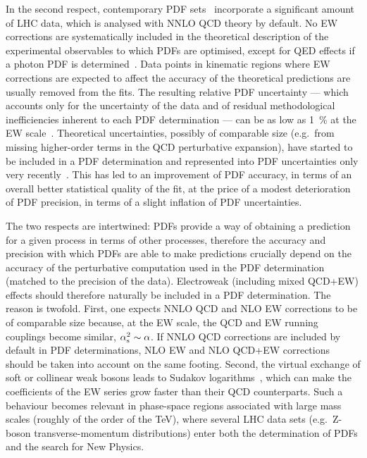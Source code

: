 In the second respect, contemporary PDF
sets~\cite{Harland-Lang:2014zoa,Ball:2017nwa,Hou:2019efy}
incorporate a significant amount of LHC data, which is analysed with NNLO QCD 
theory by default. No EW corrections are systematically included in the 
theoretical description of the experimental observables to which PDFs are 
optimised, except for QED effects if a photon PDF is 
determined~\cite{Schmidt:2015zda,Manohar:2016nzj,Manohar:2017eqh,Bertone:2017bme,Harland-Lang:2019pla}.
Data points in kinematic regions where EW corrections are expected to affect
the accuracy of the theoretical predictions are usually removed from the fits.
The resulting relative PDF uncertainty --- which accounts only for the
uncertainty of the data and of residual methodological inefficiencies inherent to 
each PDF determination --- can be as low as \SI{1}{\percent} at the EW
scale~\cite{Ball:2017nwa}. Theoretical uncertainties, possibly of comparable 
size (e.g.\ from missing higher-order terms in the QCD perturbative
expansion), have started to be included in a PDF determination and represented 
into PDF uncertainties only very 
recently~\cite{AbdulKhalek:2019bux,AbdulKhalek:2019ihb}. This has led to an 
improvement of PDF accuracy, in terms of an overall
better statistical quality of the fit, at the price of a modest deterioration 
of PDF precision, in terms of a slight inflation of PDF uncertainties.

The two respects are intertwined: PDFs provide a way of obtaining a prediction
for a given process in terms of other processes, therefore the accuracy and 
precision with which PDFs are able to make predictions crucially depend on 
the accuracy of the perturbative computation used in the PDF determination
(matched to the precision of the data). Electroweak (including mixed QCD+EW) 
effects should therefore naturally be included in a PDF determination. The 
reason is twofold. First, one expects NNLO QCD and NLO EW corrections to be of 
comparable size because, at the EW scale, the QCD and EW running couplings 
become similar, $\alpha_\mathrm{s}^2\sim \alpha$. If NNLO QCD corrections are included
by default in PDF determinations, NLO EW and NLO QCD+EW corrections should be
taken into account on the same footing. Second, the virtual exchange of soft or 
collinear weak bosons leads to Sudakov 
logarithms~\cite{Denner:2000jv,Denner:2001gw},
which can make the coefficients of the EW series grow faster than 
their QCD counterparts. Such a behaviour becomes relevant in
phase-space regions associated with large mass scales (roughly of the order
of the \si{\tera\electronvolt}), where several LHC data sets (e.g.\ Z-boson
transverse-momentum distributions) enter both the determination of PDFs and the search
for New Physics.

